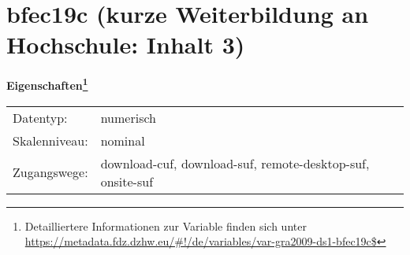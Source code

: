 
    \setcounter{footnote}{0}

    \vspace*{-1.8cm}
	\section{bfec19c (kurze Weiterbildung an Hochschule: Inhalt 3)}
	\label{section:bfec19c}



    \vspace*{0.5cm}
    \noindent\textbf{Eigenschaften\footnote{Detailliertere Informationen zur Variable finden sich unter
		\url{https://metadata.fdz.dzhw.eu/\#!/de/variables/var-gra2009-ds1-bfec19c$}}}\\
	\begin{tabularx}{\hsize}{@{}lX}
	Datentyp: & numerisch \\
	Skalenniveau: & nominal \\
	Zugangswege: &
	  download-cuf, 
	  download-suf, 
	  remote-desktop-suf, 
	  onsite-suf
 \\
    \end{tabularx}



